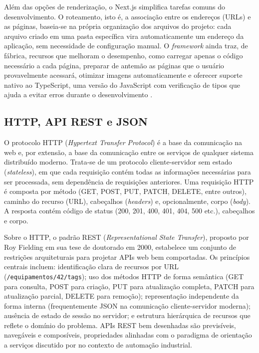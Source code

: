 \par Além das opções de renderização, o Next.js simplifica tarefas comuns do desenvolvimento. O roteamento, isto é, a associação entre os endereços (URLs) e as páginas, baseia-se na própria organização dos arquivos do projeto: cada arquivo criado em uma pasta específica vira automaticamente um endereço da aplicação, sem necessidade de configuração manual. O \emph{framework} ainda traz, de fábrica, recursos que melhoram o desempenho, como carregar apenas o código necessário a cada página, preparar de antemão as páginas que o usuário provavelmente acessará, otimizar imagens automaticamente e oferecer suporte nativo ao TypeScript, uma versão do JavaScript com verificação de tipos que ajuda a evitar erros durante o desenvolvimento \cite{NEXTJS_DOCS}.

\subsection{HTTP, API REST e JSON}

\par O protocolo HTTP (\emph{Hypertext Transfer Protocol}) é a base da comunicação na web e, por extensão, a base da comunicação entre os serviços de qualquer sistema distribuído moderno. Trata-se de um protocolo cliente-servidor sem estado (\emph{stateless}), em que cada requisição contém todas as informações necessárias para ser processada, sem dependência de requisições anteriores. Uma requisição HTTP é composta por método (GET, POST, PUT, PATCH, DELETE, entre outros), caminho do recurso (URL), cabeçalhos (\emph{headers}) e, opcionalmente, corpo (\emph{body}). A resposta contém código de status (200, 201, 400, 401, 404, 500 etc.), cabeçalhos e corpo.

\par Sobre o HTTP, o padrão REST (\emph{Representational State Transfer}), proposto por Roy Fielding em sua tese de doutorado em 2000, estabelece um conjunto de restrições arquiteturais para projetar APIs web bem comportadas. Os princípios centrais incluem: identificação clara de recursos por URL (\texttt{/equipamentos/42/tags}); uso dos métodos HTTP de forma semântica (GET para consulta, POST para criação, PUT para atualização completa, PATCH para atualização parcial, DELETE para remoção); representação independente da forma interna (frequentemente JSON na comunicação cliente-servidor moderna); ausência de estado de sessão no servidor; e estrutura hierárquica de recursos que reflete o domínio do problema. APIs REST bem desenhadas são previsíveis, navegáveis e composíveis, propriedades alinhadas com o paradigma de orientação a serviços discutido por \textcite{COLOMBO2014_STATE_ART_AUTOMATION} no contexto de automação industrial.

